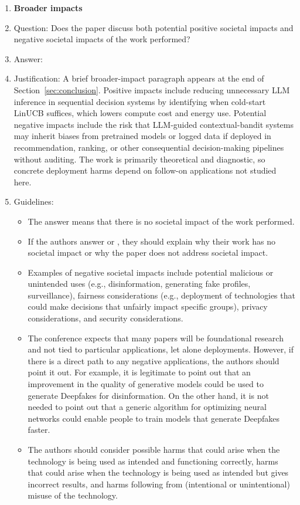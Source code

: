 \documentclass{article}
\theoremstyle{definition}
\theoremstyle{remark}
\theoremstyle{remark}
\begin{document}
\begin{enumerate}
\item {\bf Broader impacts}
    \item[] Question: Does the paper discuss both potential positive societal impacts and negative societal impacts of the work performed?
    \item[] Answer: \answerYes{} %
    \item[] Justification: A brief broader-impact paragraph appears at the end of Section~\ref{sec:conclusion}. Positive impacts include reducing unnecessary LLM inference in sequential decision systems by identifying when cold-start LinUCB suffices, which lowers compute cost and energy use. Potential negative impacts include the risk that LLM-guided contextual-bandit systems may inherit biases from pretrained models or logged data if deployed in recommendation, ranking, or other consequential decision-making pipelines without auditing. The work is primarily theoretical and diagnostic, so concrete deployment harms depend on follow-on applications not studied here.
    \item[] Guidelines:
    \begin{itemize}
        \item The answer \answerNA{} means that there is no societal impact of the work performed.
        \item If the authors answer \answerNA{} or \answerNo, they should explain why their work has no societal impact or why the paper does not address societal impact.
        \item Examples of negative societal impacts include potential malicious or unintended uses (e.g., disinformation, generating fake profiles, surveillance), fairness considerations (e.g., deployment of technologies that could make decisions that unfairly impact specific groups), privacy considerations, and security considerations.
        \item The conference expects that many papers will be foundational research and not tied to particular applications, let alone deployments. However, if there is a direct path to any negative applications, the authors should point it out. For example, it is legitimate to point out that an improvement in the quality of generative models could be used to generate Deepfakes for disinformation. On the other hand, it is not needed to point out that a generic algorithm for optimizing neural networks could enable people to train models that generate Deepfakes faster.
        \item The authors should consider possible harms that could arise when the technology is being used as intended and functioning correctly, harms that could arise when the technology is being used as intended but gives incorrect results, and harms following from (intentional or unintentional) misuse of the technology.

\end{itemize}
\end{enumerate}
\end{document}
